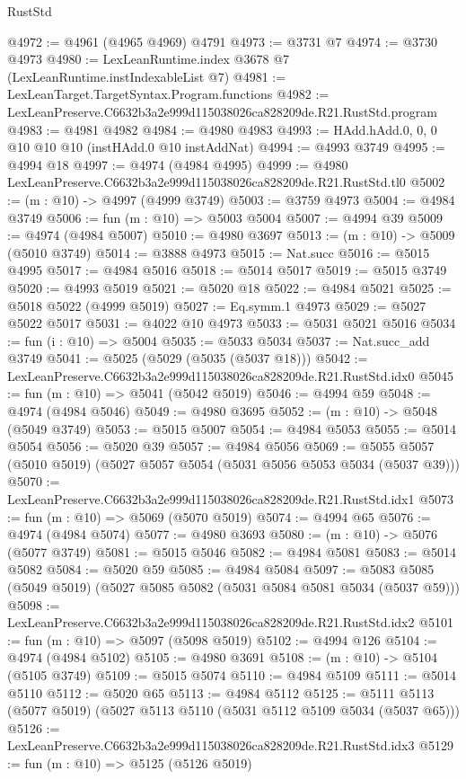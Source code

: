 \begin{lexlean}{RustStd}
\begin{coremodule}
@4972 := @4961 (@4965 @4969) @4791
@4973 := @3731 @7
@4974 := @3730 @4973
@4980 := LexLeanRuntime.index @3678 @7 (LexLeanRuntime.instIndexableList @7)
@4981 := LexLeanTarget.TargetSyntax.Program.functions
@4982 := LexLeanPreserve.C6632b3a2e999d115038026ca828209de.R21.RustStd.program
@4983 := @4981 @4982
@4984 := @4980 @4983
@4993 := HAdd.hAdd.{0, 0, 0} @10 @10 @10 (instHAdd.{0} @10 instAddNat)
@4994 := @4993 @3749
@4995 := @4994 @18
@4997 := @4974 (@4984 @4995)
@4999 := @4980 LexLeanPreserve.C6632b3a2e999d115038026ca828209de.R21.RustStd.tl0
@5002 := (m : @10) -> @4997 (@4999 @3749)
@5003 := @3759 @4973
@5004 := @4984 @3749
@5006 := fun (m : @10) => @5003 @5004
@5007 := @4994 @39
@5009 := @4974 (@4984 @5007)
@5010 := @4980 @3697
@5013 := (m : @10) -> @5009 (@5010 @3749)
@5014 := @3888 @4973
@5015 := Nat.succ
@5016 := @5015 @4995
@5017 := @4984 @5016
@5018 := @5014 @5017
@5019 := @5015 @3749
@5020 := @4993 @5019
@5021 := @5020 @18
@5022 := @4984 @5021
@5025 := @5018 @5022 (@4999 @5019)
@5027 := Eq.symm.{1} @4973
@5029 := @5027 @5022 @5017
@5031 := @4022 @10 @4973
@5033 := @5031 @5021 @5016
@5034 := fun (i : @10) => @5004
@5035 := @5033 @5034
@5037 := Nat.succ_add @3749
@5041 := @5025 (@5029 (@5035 (@5037 @18)))
@5042 := LexLeanPreserve.C6632b3a2e999d115038026ca828209de.R21.RustStd.idx0
@5045 := fun (m : @10) => @5041 (@5042 @5019)
@5046 := @4994 @59
@5048 := @4974 (@4984 @5046)
@5049 := @4980 @3695
@5052 := (m : @10) -> @5048 (@5049 @3749)
@5053 := @5015 @5007
@5054 := @4984 @5053
@5055 := @5014 @5054
@5056 := @5020 @39
@5057 := @4984 @5056
@5069 := @5055 @5057 (@5010 @5019) (@5027 @5057 @5054 (@5031 @5056 @5053 @5034 (@5037 @39)))
@5070 := LexLeanPreserve.C6632b3a2e999d115038026ca828209de.R21.RustStd.idx1
@5073 := fun (m : @10) => @5069 (@5070 @5019)
@5074 := @4994 @65
@5076 := @4974 (@4984 @5074)
@5077 := @4980 @3693
@5080 := (m : @10) -> @5076 (@5077 @3749)
@5081 := @5015 @5046
@5082 := @4984 @5081
@5083 := @5014 @5082
@5084 := @5020 @59
@5085 := @4984 @5084
@5097 := @5083 @5085 (@5049 @5019) (@5027 @5085 @5082 (@5031 @5084 @5081 @5034 (@5037 @59)))
@5098 := LexLeanPreserve.C6632b3a2e999d115038026ca828209de.R21.RustStd.idx2
@5101 := fun (m : @10) => @5097 (@5098 @5019)
@5102 := @4994 @126
@5104 := @4974 (@4984 @5102)
@5105 := @4980 @3691
@5108 := (m : @10) -> @5104 (@5105 @3749)
@5109 := @5015 @5074
@5110 := @4984 @5109
@5111 := @5014 @5110
@5112 := @5020 @65
@5113 := @4984 @5112
@5125 := @5111 @5113 (@5077 @5019) (@5027 @5113 @5110 (@5031 @5112 @5109 @5034 (@5037 @65)))
@5126 := LexLeanPreserve.C6632b3a2e999d115038026ca828209de.R21.RustStd.idx3
@5129 := fun (m : @10) => @5125 (@5126 @5019)

\end{coremodule}
\end{lexlean}
